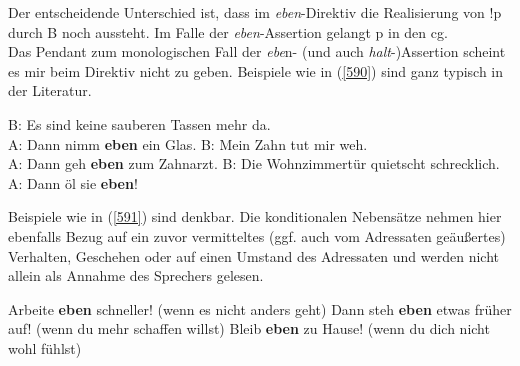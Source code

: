 Der entscheidende Unterschied ist, dass im \textit{eben}-Direktiv die Realisierung von !p durch B noch aussteht. Im Falle der \textit{eben}-Assertion gelangt p in den cg.\\

\noindent
Das Pendant zum monologischen Fall der \textit{ebe}n- (und auch \textit{halt}-)Assertion scheint es mir beim Direktiv nicht zu geben. Beispiele wie in (\ref{590}) sind ganz typisch in der Literatur.

\begin{exe}
	\ex\label{590} 
		\begin{xlist}	
			\ex\label{590a} B: Es sind keine sauberen Tassen mehr da.\\
							A: Dann nimm \textbf{eben} ein Glas.
			\ex\label{590b} B: Mein Zahn tut mir weh.\\
							A: Dann geh \textbf{eben} zum Zahnarzt.
			\ex\label{590c} B: Die Wohnzimmertür quietscht schrecklich.\\
							A: Dann öl sie \textbf{eben}!
			\hfill\hbox{\citet[105/101/101]{Dahl1988}}
		\end{xlist}
\end{exe}
Beispiele wie in (\ref{591}) sind denkbar. Die konditionalen Nebensätze nehmen hier ebenfalls Bezug auf ein zuvor vermitteltes (ggf. auch vom Adressaten geäußertes) Verhalten, Geschehen oder auf einen Umstand des Adressaten und werden nicht allein als Annahme des Sprechers gelesen.
\begin{exe}
	\ex\label{591} 
		\begin{xlist}	
			\ex\label{591a} Arbeite \textbf{eben} schneller! (wenn es nicht anders geht)
			\ex\label{591b} Dann steh \textbf{eben} etwas früher auf! (wenn du mehr schaffen willst)
			\ex\label{591c} Bleib \textbf{eben} zu Hause! (wenn du dich nicht wohl fühlst)\\
			\hbox{}\hfill\hbox{\citet[122]{Helbig1990}}
		\end{xlist}
\end{exe}
